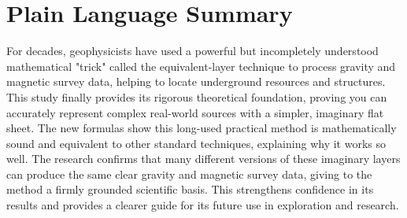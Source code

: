 \documentclass[draft]{agujournal2019}
\begin{document}


\section*{Plain Language Summary}
For decades, geophysicists have used a powerful but incompletely understood mathematical "trick"
called the equivalent-layer technique to process gravity and magnetic survey data, helping to locate 
underground resources and structures. This study finally provides its rigorous theoretical foundation, 
proving you can accurately represent complex real-world sources with a simpler, imaginary flat sheet. 
The new formulas show this long-used practical method is mathematically sound and equivalent to other 
standard techniques, explaining why it works so well. The research confirms that many different versions 
of these imaginary layers can produce the same clear gravity and magnetic survey data, giving to the method 
a firmly grounded scientific basis. This strengthens confidence in its results and provides a clearer guide 
for its future use in exploration and research.


%
%

%


%
%
%
%
\end{document}
